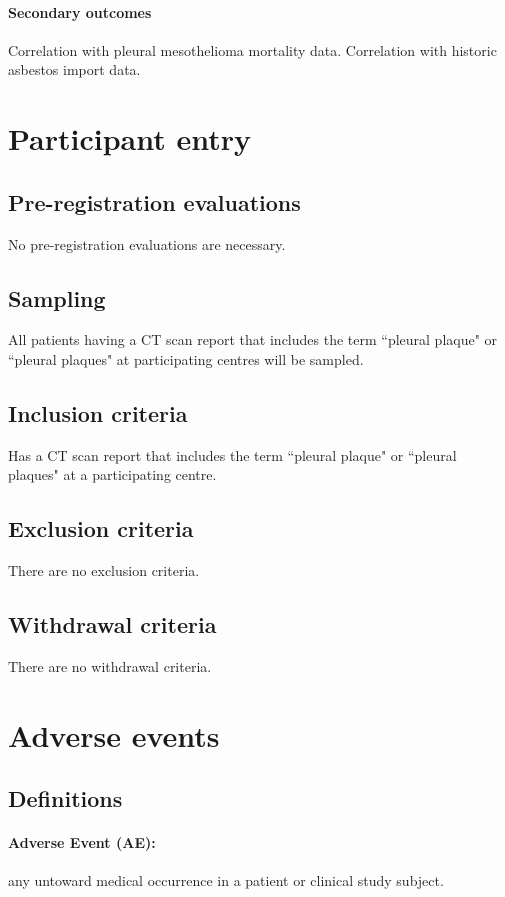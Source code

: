 \documentclass[a4paper,10pt]{article}
\begin{document}
\paragraph{Secondary outcomes}
Correlation with pleural mesothelioma mortality data. Correlation with historic asbestos import data.


\section{Participant entry}
\subsection{Pre-registration evaluations}
No pre-registration evaluations are necessary.

\subsection{Sampling}
All patients having a CT scan report that includes the term ``pleural plaque" or ``pleural plaques" at participating centres will be sampled. 

\subsection{Inclusion criteria}
Has a CT scan report that includes the term ``pleural plaque" or ``pleural plaques" at a participating centre.

\subsection{Exclusion criteria}
There are no exclusion criteria.

\subsection{Withdrawal criteria} 
There are no withdrawal criteria.

\section{Adverse events}

\subsection{Definitions}

\paragraph{Adverse Event (AE):}any untoward medical occurrence in a patient or clinical study subject.  
\end{document}
